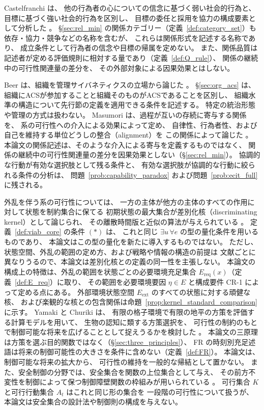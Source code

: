 Castelfranchi は、
他の行為者の心についての信念に基づく弱い社会的行為と、
目標に基づく強い社会的行為を区別し、
目標の委任と採用を協力の構成要素として分析した
\cite{Castelfranchi1998}。
\S\ref{sec:rel_min} の関係カテゴリー（定義~\ref{def:category_set}）も
依存・協力・競争などの名称を含むが、
これらは関係形式を記述する名称であり、
成立条件として行為者の信念や目標の帰属を定めない。
また、関係品質は記述者が定める評価規則に相対する量であり（定義~\ref{def:Q_rule}）、
関係の継続中の可行性関連量の差分を、
その外部対象による因果効果とはしない。

Beer は、組織を管理サイバネティクスの立場から論じた
\cite{Beer1972}。
\S\ref{sec:org_acs} は、
組織にACSが参加することと組織そのものがACSであることを区別し、
組織水準の構造について先行節の定義を適用できる条件を記述する。
特定の統治形態や管理の方式は扱わない。
Masumori は、過程が互いの存続に寄与する関係を、
系の可行性への介入による効果によって定め、
自律性、行為者性、および自己を維持する単位どうしの整合（alignment）を
この関係によって論じた
\cite{Masumori2026}。
本論文の関係記述は、そのような介入による寄与を定義するものではなく、
関係の継続中の可行性関連量の差分を因果効果としない（\S\ref{sec:rel_min}）。
協調的な行動が有効な選択肢として残る条件と、
有効な選択肢が協調的な行動に絞られる条件の分析は、
問題~\ref{prob:capability_paradox} および問題~\ref{prob:ecit_full} に残される。

外乱を伴う系の可行性については、
一方の主体が他方の主体のすべての作用に対して状態を制約集合に保てる
初期状態の最大集合が差別化核（discriminating kernel）として論じられ、
その離散時間版と近似の算法が与えられている
\cite{CardaliaguetQuincampoixSaintPierre1994}。
定義~\ref{def:viab_core} の条件 $(\ast)$ は、
これと同じ $\exists u\,\forall e$ の型の量化条件を用いるものであり、
本論文はこの型の量化を新たに導入するものではない。
ただし、状態空間、外乱の範囲の定め方、および戦略や情報の構造の前提は
文献ごとに異なりうるので、本論文は差別化核との定義の同一性を主張しない。
本論文の構成上の特徴は、外乱の範囲を状態ごとの必要環境充足集合
$E_{\mathrm{req}}(x)$（定義~\ref{def:E_req}）に取り、
その範囲を必要環境要因 $\eta\in E$ と構成要件 CR-1 によって定める点にある。
外部環境状態空間 $E_{\mathrm{ext}}$ のすべての状態に対する頑健な核、
および楽観的な核との包含関係は命題~\ref{prop:kernel_standard_comparison} に示す。
Yamaki と Churiki は、
有限の格子環境で有限の地平の方策を評価する計算モデルを用いて、
生物の認知に類する方策選択を、
可行性の制約のもとで制御可能な将来を広げることとして捉えうるかを検討した
\cite{YamakiChuriki2026}。
本論文の三原理は方策を選ぶ目的関数ではなく（\S\ref{sec:three_principles}）、
FR の時刻別充足述語は将来の制御可能性の大きさを条件に含めない（定義~\ref{def:FR}）。
本論文は、制御可能な将来の拡大から、
可行性の維持を一般的な帰結として置かない。
また、安全制御の分野では、安全集合を関数の上位集合として与え、
その前方不変性を制御によって保つ制御障壁関数の枠組みが用いられている
\cite{AmesEtAl2019}。
可行集合 $K$ と可行行動集合 $A_t$ はこれと同じ形の集合を
一段階の可行性について扱うが、
本論文は安全集合の設計法や制御則の構成を与えない。

